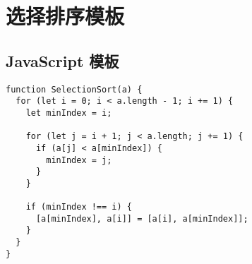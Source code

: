 \newpage
\section{选择排序模板}

\subsection{JavaScript 模板}

\begin{verbatim}
function SelectionSort(a) {
  for (let i = 0; i < a.length - 1; i += 1) {
    let minIndex = i;

    for (let j = i + 1; j < a.length; j += 1) {
      if (a[j] < a[minIndex]) {
        minIndex = j;
      }
    }

    if (minIndex !== i) {
      [a[minIndex], a[i]] = [a[i], a[minIndex]];
    }
  }
}
\end{verbatim}
